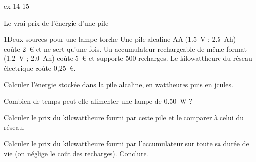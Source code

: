 \begin{blocLivre}{ex-14-15}
\begin{exercice}[3]{Le vrai prix de l'énergie d'une pile}
\begin{docu}{1}{Deux sources pour une lampe torche}
Une pile alcaline AA (\qty{1,5}{V} ; \qty{2,5}{Ah}) coûte 2~€ et ne sert qu'une fois. Un accumulateur rechargeable de même format (\qty{1,2}{V} ;
\qty{2,0}{Ah}) coûte 5~€ et supporte 500 recharges. Le kilowattheure du réseau électrique coûte 0,25~€.
\end{docu}
\begin{questions}
\item Calculer l'énergie stockée dans la pile alcaline, en wattheures puis en joules.
\item Combien de temps peut-elle alimenter une lampe de \qty{0,50}{W} ?
\item \initiative Calculer le prix du kilowattheure fourni par cette pile et le comparer à celui du réseau.
\item Calculer le prix du kilowattheure fourni par l'accumulateur sur toute sa durée de vie (on néglige le coût des recharges). Conclure.
\end{questions}
\end{exercice}
\end{blocLivre}

